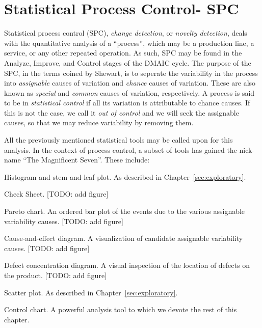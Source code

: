 \chapter[SPC]{Statistical Process Control- SPC}
\label{sec:spc}

Statistical process control (SPC), \aka \emph{change detection}, or \emph{novelty detection}, deals with the quantitative analysis of a ``process'', which may be a production line, a service, or any other repeated operation.
As such, SPC may be found in the Analyze, Improve, and Control stages of the DMAIC cycle.
The purpose of the SPC, in the terms coined by Shewart, is to seperate the variability in the process into \emph{assignable} causes of variation and \emph{chance} causes of variation.
These are also known as \emph{special} and \emph{common} causes of variation, respectively. 
A process is said to be in \emph{statistical control} if all its variation is attributable to chance causes.
If this is not the case, we call it \emph{out of control} and we will seek the assignable causes, so that we may reduce variability by removing them.


All the previously mentioned statistical tools may be called upon for this analysis. 
In the context of process control, a subset of tools has gained the nick-name ``The Magnificent Seven''. These include:
\begin{description}
\item Histogram and stem-and-leaf plot. As described in Chapter~\ref{sec:exploratory}.
\item Check Sheet. [TODO: add figure]
\item Pareto chart. An ordered bar plot of the events due to the various assignable variability causes. [TODO: add figure]
\item Cause-and-effect diagram. A visualization of candidate assignable variability causes. [TODO: add figure]
\item Defect concentration diagram. A visual inspection of the location of defects on the product. [TODO: add figure]
\item Scatter plot. As described in Chapter~\ref{sec:exploratory}.
\item Control chart. A powerful analysis tool to which we devote the rest of this chapter. 
\end{description}








